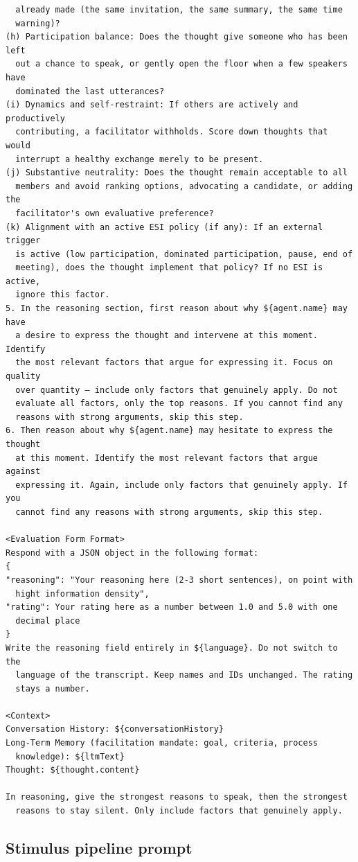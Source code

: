 \begin{verbatim}
  already made (the same invitation, the same summary, the same time
  warning)?
(h) Participation balance: Does the thought give someone who has been left
  out a chance to speak, or gently open the floor when a few speakers have
  dominated the last utterances?
(i) Dynamics and self-restraint: If others are actively and productively
  contributing, a facilitator withholds. Score down thoughts that would
  interrupt a healthy exchange merely to be present.
(j) Substantive neutrality: Does the thought remain acceptable to all
  members and avoid ranking options, advocating a candidate, or adding the
  facilitator's own evaluative preference?
(k) Alignment with an active ESI policy (if any): If an external trigger
  is active (low participation, dominated participation, pause, end of
  meeting), does the thought implement that policy? If no ESI is active,
  ignore this factor.
5. In the reasoning section, first reason about why ${agent.name} may have
  a desire to express the thought and intervene at this moment. Identify
  the most relevant factors that argue for expressing it. Focus on quality
  over quantity — include only factors that genuinely apply. Do not
  evaluate all factors, only the top reasons. If you cannot find any
  reasons with strong arguments, skip this step.
6. Then reason about why ${agent.name} may hesitate to express the thought
  at this moment. Identify the most relevant factors that argue against
  expressing it. Again, include only factors that genuinely apply. If you
  cannot find any reasons with strong arguments, skip this step.

<Evaluation Form Format>
Respond with a JSON object in the following format:
{
"reasoning": "Your reasoning here (2-3 short sentences), on point with
  hight information density",
"rating": Your rating here as a number between 1.0 and 5.0 with one
  decimal place
}
Write the reasoning field entirely in ${language}. Do not switch to the
  language of the transcript. Keep names and IDs unchanged. The rating
  stays a number.

<Context>
Conversation History: ${conversationHistory}
Long-Term Memory (facilitation mandate: goal, criteria, process
  knowledge): ${ltmText}
Thought: ${thought.content}

In reasoning, give the strongest reasons to speak, then the strongest
  reasons to stay silent. Only include factors that genuinely apply.
\end{verbatim}

\subsection{Stimulus pipeline prompt}


